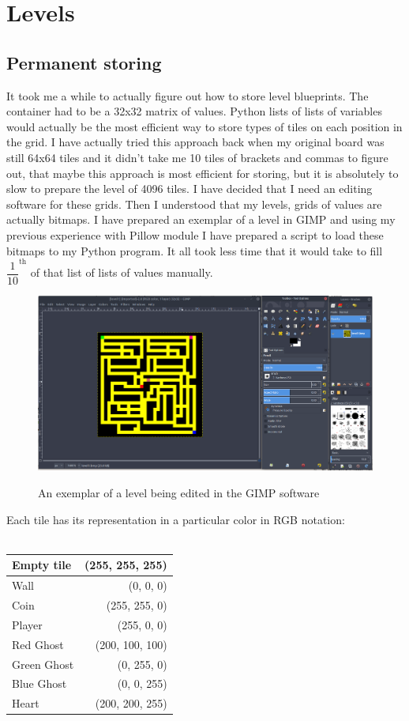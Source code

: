 \documentclass[11pt,a4paper,notitlepage]{report}
\newcommand{\dsubsection}[1]{\FloatBarrier \subsection{#1}}
\newenvironment{img}{
	\begin{center}
		\begin{figure}[H]
			\begin{center}
			
}{
	\end{center}
		\end{figure}
			\end{center}
}
\begin{document}
		\section{Levels}
		\label{Levels}
			\dsubsection{Permanent storing}
				\label{level-permanent-storing}
				It took me a while to actually figure out how to store level blueprints. The container had to be a 32x32 matrix of values. Python lists of lists of variables would actually be the most efficient way to store types of tiles on each position in the grid. I have actually tried this approach back when my original board was still 64x64 tiles and it didn't take me 10 tiles of brackets and commas to figure out, that maybe this approach is most efficient for storing, but it is absolutely to slow to prepare the level of 4096 tiles. I have decided that I need an editing software for these grids. Then I understood that my levels, grids of values are actually bitmaps. I have prepared an exemplar of a level in GIMP and using my previous experience with Pillow module I have prepared a script to load these bitmaps to my Python program. It all took less time that it would take to fill $\dfrac{1}{10}^{\text{th}}$ of that list of lists of values manually.
				\begin{img}
					\includegraphics[width=350pt]{images/gimp_level_editing}\\
					\caption{An exemplar of a level being edited in the GIMP software}
					\label{gimplevel}
				\end{img}
				Each tile has its representation in a particular color in RGB notation:\\ \\
				\begin{tabular}{| l | r |}
					\hline 
					Empty tile & (255, 255, 255) \\ \hline
					Wall & (0, 0, 0) \\ \hline
					Coin & (255, 255, 0) \\ \hline
					Player & (255, 0, 0) \\ \hline
					Red Ghost & (200, 100, 100) \\ \hline
					Green Ghost & (0, 255, 0) \\ \hline
					Blue Ghost & (0, 0, 255) \\ \hline
					Heart & (200, 200, 255) \\
					\hline
				\end{tabular}
\end{document}
